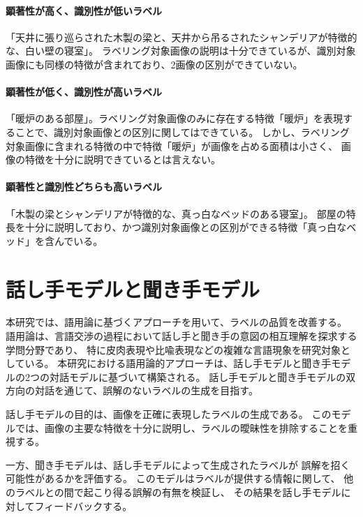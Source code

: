 \documentclass[a4paper,11pt]{jreport}
\begin{document}
\paragraph*{顕著性が高く、識別性が低いラベル}
「天井に張り巡らされた木製の梁と、天井から吊るされたシャンデリアが特徴的な、白い壁の寝室」。
ラベリング対象画像の説明は十分できているが、識別対象画像にも同様の特徴が含まれており、2画像の区別ができていない。
\paragraph*{顕著性が低く、識別性が高いラベル}
「暖炉のある部屋」。ラベリング対象画像のみに存在する特徴「暖炉」を表現することで、識別対象画像との区別に関してはできている。
しかし、ラベリング対象画像に含まれる特徴の中で特徴「暖炉」が画像を占める面積は小さく、
画像の特徴を十分に説明できているとは言えない。
\paragraph*{顕著性と識別性どちらも高いラベル}
「木製の梁とシャンデリアが特徴的な、真っ白なベッドのある寝室」。
部屋の特長を十分に説明しており、かつ識別対象画像との区別ができる特徴「真っ白なベッド」を含んでいる。

\section{話し手モデルと聞き手モデル}

本研究では、語用論に基づくアプローチを用いて、ラベルの品質を改善する。
語用論は、言語交渉の過程において話し手と聞き手の意図の相互理解を探求する学問分野であり、
特に皮肉表現や比喩表現などの複雑な言語現象を研究対象としている。
本研究における語用論的アプローチは、話し手モデルと聞き手モデルの2つの対話モデルに基づいて構築される。
話し手モデルと聞き手モデルの双方向の対話を通じて、誤解のないラベルの生成を目指す。

話し手モデルの目的は、画像を正確に表現したラベルの生成である。
このモデルでは、画像の主要な特徴を十分に説明し、ラベルの曖昧性を排除することを重視する。

一方、聞き手モデルは、話し手モデルによって生成されたラベルが
誤解を招く可能性があるかを評価する。
このモデルはラベルが提供する情報に関して、
他のラベルとの間で起こり得る誤解の有無を検証し、
その結果を話し手モデルに対してフィードバックする。

\end{document}
